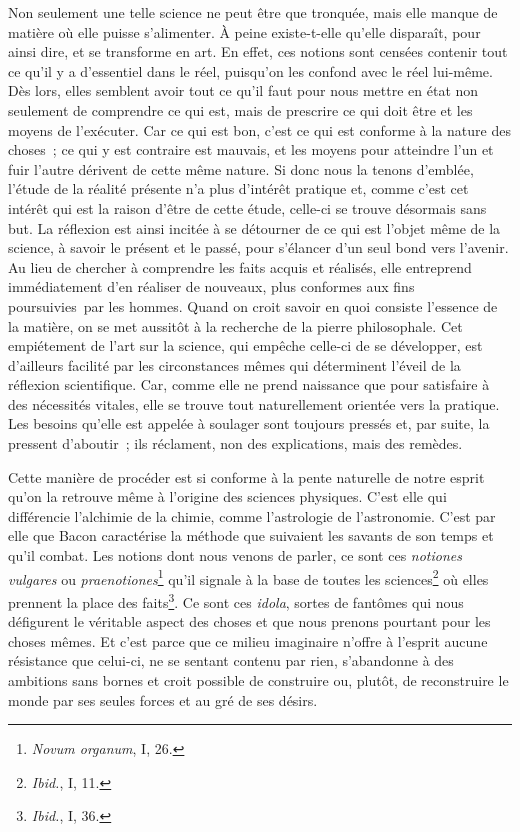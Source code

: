 \documentclass[french,twoside]{book} %
\begin{document}
Non seulement une telle science ne peut être que tronquée, mais elle manque de matière où elle puisse s’alimenter. À peine existe-t-elle qu’elle disparaît, pour ainsi dire, et se transforme en art. En effet, ces notions sont censées contenir tout ce qu’il y a d’essentiel dans le réel, puisqu’on les confond avec le réel lui-même. Dès lors, elles semblent avoir tout ce qu’il faut pour nous mettre en état non seulement de comprendre ce qui est, mais de prescrire ce qui doit être et les moyens de l’exécuter. Car ce qui est bon, c’est ce qui est conforme à la nature des choses ; ce qui y est contraire est mauvais, et les moyens pour atteindre l’un et fuir l’autre dérivent de cette même nature. Si donc nous la tenons d’emblée, l’étude de la réalité présente n’a plus d’intérêt pratique et, comme c’est cet intérêt qui est la raison d’être de cette étude, celle-ci se trouve désormais sans but. La réflexion est ainsi incitée à se détourner de ce qui est l’objet même de la science, à savoir le présent et le passé, pour s’élancer d’un seul bond vers l’avenir. Au lieu de chercher à comprendre les faits acquis et réalisés, elle entreprend immédiatement d’en réaliser de nouveaux, plus conformes aux fins poursuivies par les hommes. Quand on croit savoir en quoi consiste l’essence de la matière, on se met aussitôt à la recherche de la pierre philosophale. Cet empiétement de l’art sur la science, qui empêche celle-ci de se développer, est d’ailleurs facilité par les circonstances mêmes qui déterminent l’éveil de la réflexion scientifique. Car, comme elle ne prend naissance que pour satisfaire à des nécessités vitales, elle se trouve tout naturellement orientée vers la pratique. Les besoins qu’elle est appelée à soulager sont toujours pressés et, par suite, la pressent d’aboutir ; ils réclament, non des explications, mais des remèdes.\par
Cette manière de procéder est si conforme à la pente naturelle de notre esprit qu’on la retrouve même à l’origine des sciences physiques. C’est elle qui différencie l’alchimie de la chimie, comme l’astrologie de l’astronomie. C’est par elle que Bacon caractérise la méthode que suivaient les savants de son temps et qu’il combat. Les notions dont nous venons de parler, ce sont ces {\itshape notiones vulgares} ou {\itshape praenotiones}\footnote{{\itshape Novum organum}, I, 26.} qu’il signale à la base de toutes les sciences\footnote{{\itshape Ibid.}, I, 11.} où elles prennent la place des faits\footnote{{\itshape Ibid.}, I, 36.}. Ce sont ces {\itshape idola}, sortes de fantômes qui nous défigurent le véritable aspect des choses et que nous prenons pourtant pour les choses mêmes. Et c’est parce que ce milieu imaginaire n’offre à l’esprit aucune résistance que celui-ci, ne se sentant contenu par rien, s’abandonne à des ambitions sans bornes et croit possible de construire ou, plutôt, de reconstruire le monde par ses seules forces et au gré de ses désirs.\par
\end{document}
